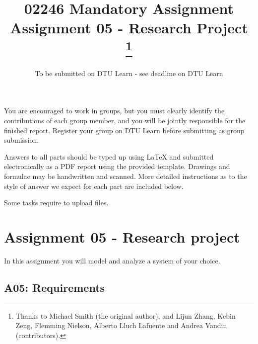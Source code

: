 \documentclass[12pt,a4paper]{article}
\title{02246 Mandatory Assignment\\
Assignment 05 - Research Project \footnote{Thanks to Michael Smith (the original author), and Lijun Zhang, Kebin Zeng, Flemming Nielson, Alberto Lluch Lafuente and Andrea Vandin (contributors).}}
\date{To be submitted on DTU Learn - see deadline on DTU Learn}
\begin{document}
\maketitle

\noindent
You are encouraged to work in groups, 
but you must clearly identify the contributions of each group member, and you will be jointly responsible for the finished report. Register your group on DTU Learn before submitting as group submission. 
\par
Answers to all parts should be typed up using LaTeX and submitted electronically as a PDF report using the provided template. Drawings and formulae may be handwritten
and scanned. More detailed instructions as to the style of answer we expect for each part are included below.
\par
Some tasks require to upload files. %


\newif\ifwithanswers
\withanswerstrue


\pagebreak

\section*{Assignment 05 - Research project}

In this assignment you will model and analyze a system of your choice.  

\subsection*{A05: Requirements}
\end{document}
